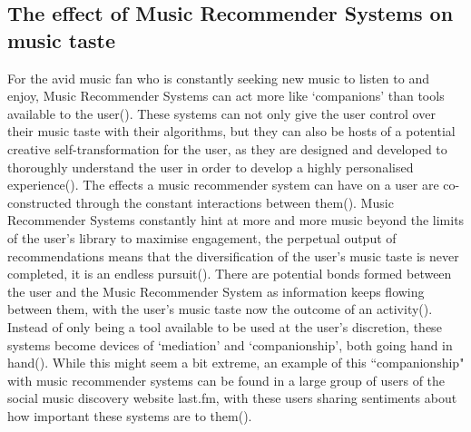 \documentclass{l4proj}
\begin{document}
\subsection{The effect of Music Recommender Systems on music taste}
For the avid music fan who is constantly seeking new music to listen to and enjoy, Music Recommender Systems can act more like `companions' than tools available to the user(\cite{Karakayali_Kostem_Galip_2017}). These systems can not only give the user control over their music taste with their algorithms, but they can also be hosts of a potential creative self-transformation for the user, as they are designed and developed to thoroughly understand the user in order to develop a highly personalised experience(\cite{Karakayali_Kostem_Galip_2017}). The effects a music recommender system can have on a user are co-constructed through the constant interactions between them(\cite{Karakayali_Kostem_Galip_2017}). Music Recommender Systems constantly hint at more and more music beyond the limits of the user's library to maximise engagement, the perpetual output of recommendations means that the diversification of the user's music taste is never completed, it is an endless pursuit(\cite{Karakayali_Kostem_Galip_2017}). There are potential bonds formed between the user and the Music Recommender System as information keeps flowing between them, with the user's music taste now the outcome of an activity(\cite{Karakayali_Kostem_Galip_2017}). Instead of only being a tool available to be used at the user's discretion, these systems become devices of `mediation' and `companionship', both going hand in hand(\cite{Karakayali_Kostem_Galip_2017}). While this might seem a bit extreme, an example of this ``companionship" with music recommender systems can be found in a large group of users of the social music discovery website last.fm, with these users sharing sentiments about how important these systems are to them(\cite{Schedl_Zamani_Chen_Deldjoo_Elahi_2018}).
\end{document}
